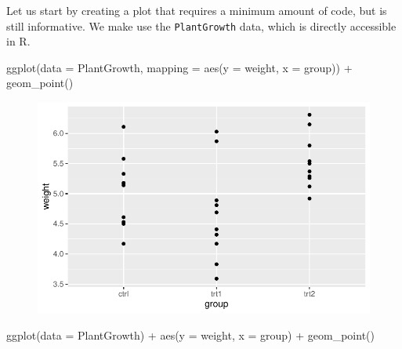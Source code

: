 \documentclass[
  letterpaper,
  DIV=11,
  numbers=noendperiod]{scrartcl}
\newenvironment{Shaded}{\begin{snugshade}}{\end{snugshade}}
\newcommand{\AttributeTok}[1]{\textcolor[rgb]{0.40,0.45,0.13}{#1}}
\newcommand{\FunctionTok}[1]{\textcolor[rgb]{0.28,0.35,0.67}{#1}}
\newcommand{\NormalTok}[1]{\textcolor[rgb]{0.00,0.23,0.31}{#1}}
\newcommand{\SpecialCharTok}[1]{\textcolor[rgb]{0.37,0.37,0.37}{#1}}
\begin{document}
Let us start by creating a plot that requires a minimum amount of code,
but is still informative. We make use the \texttt{PlantGrowth} data,
which is directly accessible in R.

\begin{Shaded}
\begin{Highlighting}[]
\FunctionTok{ggplot}\NormalTok{(}\AttributeTok{data =}\NormalTok{ PlantGrowth, }
       \AttributeTok{mapping =} \FunctionTok{aes}\NormalTok{(}\AttributeTok{y =}\NormalTok{ weight, }\AttributeTok{x =}\NormalTok{ group)) }\SpecialCharTok{+}
  \FunctionTok{geom\_point}\NormalTok{()}
\end{Highlighting}
\end{Shaded}

\begin{figure}[H]

{\centering \includegraphics{ggplot2intro_files/figure-pdf/unnamed-chunk-3-1.pdf}

}

\end{figure}

\begin{Shaded}
\begin{Highlighting}[]
\FunctionTok{ggplot}\NormalTok{(}\AttributeTok{data =}\NormalTok{ PlantGrowth) }\SpecialCharTok{+}
  \FunctionTok{aes}\NormalTok{(}\AttributeTok{y =}\NormalTok{ weight, }\AttributeTok{x =}\NormalTok{ group) }\SpecialCharTok{+}
  \FunctionTok{geom\_point}\NormalTok{()}
\end{Highlighting}
\end{Shaded}
\end{document}
